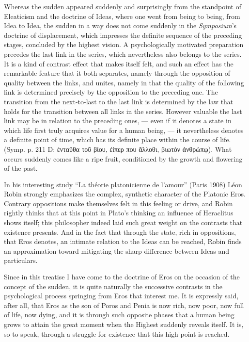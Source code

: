 \documentclass[12pt,a4paper,openany]{book}
\newcommand{\opage}[1]{\marginnote{\footnotesize\textit{[#1]}}}
\begin{document}
Whereas the sudden appeared suddenly and surprisingly
from the standpoint of Eleaticism and the doctrine of Ideas, where one went from
being to being, from Idea to Idea, the sudden
in a way does not come suddenly in the \textit{Symposium}'s doctrine of displacement,
which impresses the definite sequence of the
preceding stages, concluded by the highest vision.
A psychologically motivated preparation precedes
the last link in the series, which nevertheless also belongs to
the series.  It is a kind of contrast effect that makes itself felt,
and such an effect has the remarkable feature that it both separates,
namely through the opposition of quality between the links,
and unites, namely in that the quality of the following link is
determined precisely by the opposition to the preceding one.  The transition
from the next-to-last to the last link is determined by the law
that holds for the transition between all links in the series.
However valuable the last link may be in relation to
the preceding ones, --- even if it denotes a state in which
life first truly acquires value for a human being, --- it nevertheless denotes
\setcounter{footnote}{0}%
\opage{47}a definite point of time, which has its definite place
within the course of life.  (Symp. p. 211 D: ἐνταῦθα τοῦ βίου,
ἐίπερ που ἄλλοθι, βιωτὸν ἀνθρώπῳ).  What occurs suddenly
comes like a ripe fruit, conditioned by the growth
and flowering of the past.

In his interesting study ``La théorie platonicienne de
l'amour'' (Paris 1908) Léon Robin strongly emphasizes the
complex, synthetic character of the Platonic Eros.  Contrary
oppositions make themselves felt in this feeling or drive,
and Robin rightly thinks that at this point in Plato's thinking
an influence of Heraclitus shows itself; this philosopher indeed laid such great weight on the
contrasts that existence presents.  And in the fact that through
the state, rich in oppositions, that Eros denotes, an intimate
relation to the Ideas can be reached, Robin finds an approximation
toward mitigating the sharp difference between Ideas
and particulars.

Since in this treatise I have come to the doctrine
of Eros on the occasion of the concept of the sudden, it is
quite naturally the successive contrasts in the psychological process
springing from Eros that interest me.  It
is expressly said, after all, that Eros as the son of Poros and Penia
is now rich, now poor, now full of life, now dying, and
it is through such opposite phases that a human being
grows to attain the great moment when the Highest suddenly
reveals itself.  It is, so to speak, through a struggle for
existence that this high point is reached.
\end{document}
